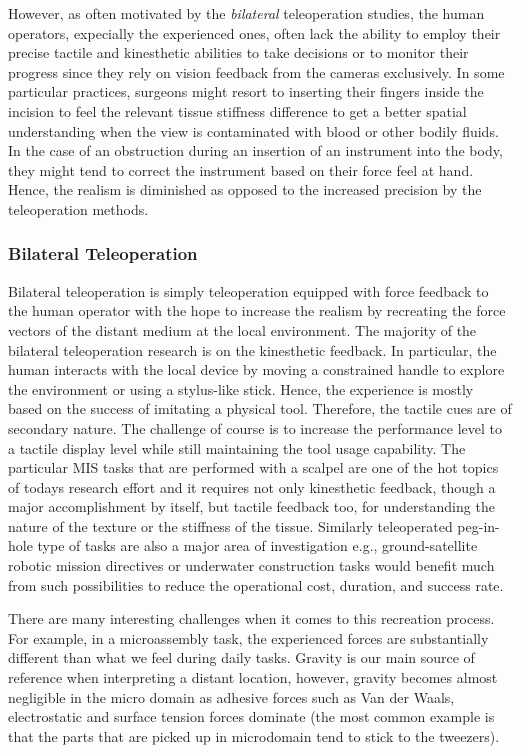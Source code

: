 However, as often motivated by the \emph{bilateral} teleoperation studies, the human operators, expecially the experienced ones, often lack the ability to employ their precise tactile and kinesthetic abilities to take decisions or to monitor their progress since they rely on vision feedback from the cameras exclusively. In some particular practices, surgeons might resort to inserting their fingers inside the incision to feel the relevant tissue stiffness difference to get a better spatial understanding when the view is contaminated with blood or other bodily fluids. In the case of an obstruction during an insertion of an instrument into the body, they might tend to correct the instrument based on their force feel at hand. Hence, the realism is diminished as opposed to the increased precision by the teleoperation methods. 

\subsubsection{Bilateral Teleoperation}

Bilateral teleoperation is simply teleoperation equipped with force feedback to the human operator with the hope to increase the realism by recreating the force vectors of the distant medium at the local environment. The majority of the bilateral teleoperation research is on the kinesthetic feedback. In particular, the human interacts with the local device by moving a constrained handle to explore the environment or using a stylus-like stick. Hence, the experience is mostly based on the success of imitating a physical tool. Therefore, the tactile cues are of secondary nature. The challenge of course is to increase the performance level to a tactile display level while still maintaining the tool usage capability. The particular MIS tasks that are performed with a scalpel are one of the hot topics of todays research effort and it requires not only kinesthetic feedback, though a major accomplishment by itself, but tactile feedback too, for understanding the nature of the texture or the stiffness of the tissue. Similarly teleoperated peg-in-hole type of tasks are also a major area of investigation e.g., ground-satellite robotic mission directives or underwater construction tasks would benefit much from such possibilities to reduce the operational cost, duration, and success rate. 



There are many interesting challenges when it comes to this recreation process. For example, in a microassembly task, the experienced forces are substantially different than what we feel during daily tasks. Gravity is our main source of reference when interpreting a distant location, however, gravity becomes almost negligible in the micro domain as adhesive forces such as Van der Waals, electrostatic and surface tension forces dominate (the most common example is that the parts that are picked up in microdomain tend to stick to the tweezers). 

